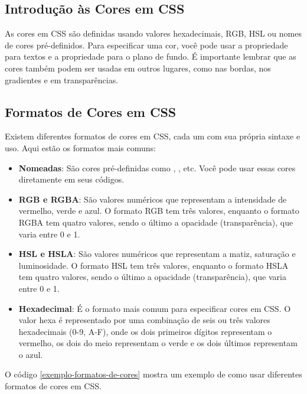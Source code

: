 \subsection{Introdução às Cores em CSS}

As cores em CSS são definidas usando valores hexadecimais, RGB, HSL ou nomes de cores pré-definidos. Para especificar uma cor, você pode usar a propriedade  para textos e a propriedade  para o plano de fundo. É importante lembrar que as cores também podem ser usadas em outros lugares, como nas bordas, nos gradientes e em transparências.

\subsection{Formatos de Cores em CSS}

Existem diferentes formatos de cores em CSS, cada um com sua própria sintaxe e uso. Aqui estão os formatos mais comuns:

\begin{itemize}
\item \textbf{Nomeadas}: São cores pré-definidas como , ,  etc. Você pode usar essas cores diretamente em seus códigos.

\item \textbf{RGB e RGBA}: São valores numéricos que representam a intensidade de vermelho, verde e azul. O formato RGB tem três valores, enquanto o formato RGBA tem quatro valores, sendo o último a opacidade (transparência), que varia entre 0 e 1.

\item \textbf{HSL e HSLA}: São valores numéricos que representam a matiz, saturação e luminosidade. O formato HSL tem três valores, enquanto o formato HSLA tem quatro valores, sendo o último a opacidade (transparência), que varia entre 0 e 1.

\item \textbf{Hexadecimal}: É o formato mais comum para especificar cores em CSS. O valor hexa é representado por uma combinação de seis ou três valores hexadecimais (0-9, A-F), onde os dois primeiros dígitos representam o vermelho, os dois do meio representam o verde e os dois últimos representam o azul.
\end{itemize}

O código \ref{exemplo-formatos-de-cores} mostra um exemplo de como usar diferentes formatos de cores em CSS.


